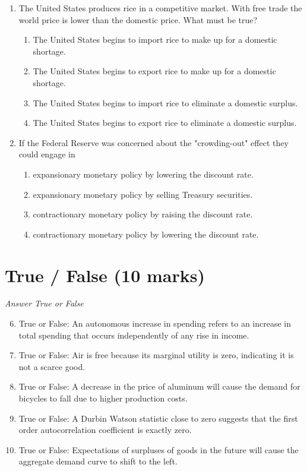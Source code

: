 \documentclass[12pt]{article}
\begin{document}
\begin{enumerate}[label=\arabic*.]
\begin{enumerate}[label=(\alph*)]
\end{enumerate}
\item The United States produces rice in a competitive market. With free trade the world price is lower than the domestic price. What must be true?
\begin{enumerate}[label=(\alph*)]
    \item The United States begins to import rice to make up for a domestic shortage.
    \item The United States begins to export rice to make up for a domestic shortage.
    \item The United States begins to import rice to eliminate a domestic surplus.
    \item The United States begins to export rice to eliminate a domestic surplus.
\end{enumerate}
\item If the Federal Reserve was concerned about the "crowding-out" effect they could engage in
\begin{enumerate}[label=(\alph*)]
    \item expansionary monetary policy by lowering the discount rate.
    \item expansionary monetary policy by selling Treasury securities.
    \item contractionary monetary policy by raising the discount rate.
    \item contractionary monetary policy by lowering the discount rate.
\end{enumerate}
\end{enumerate}

\section*{True / False (10 marks)}
\textit{Answer True or False}
\begin{enumerate}[label=\arabic*.]
\setcounter{enumi}{5}
\item True or False: An autonomous increase in spending refers to an increase in total spending that occurs independently of any rise in income.
\item True or False: Air is free because its marginal utility is zero, indicating it is not a scarce good.
\item True or False: A decrease in the price of aluminum will cause the demand for bicycles to fall due to higher production costs.
\item True or False: A Durbin Watson statistic close to zero suggests that the first order autocorrelation coefficient is exactly zero.
\item True or False: Expectations of surpluses of goods in the future will cause the aggregate demand curve to shift to the left.
\end{enumerate}
\end{document}
